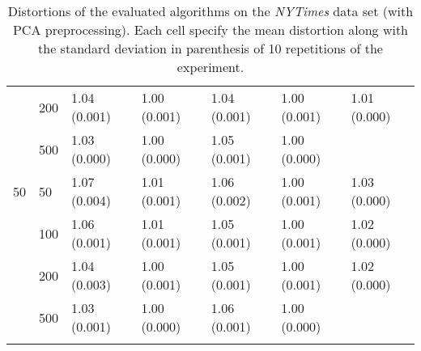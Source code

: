 \begin{longtable}{lllllll}
   & 200 &  1.04 (0.001) &   1.00 (0.001) &  1.04 (0.001) &         1.00 (0.001) &  1.01 (0.000) \\
   & 500 &  1.03 (0.000) &   1.00 (0.000) &  1.05 (0.001) &         1.00 (0.000) &  \\
 \midrule
50 & 50  &  1.07 (0.004) &   1.01 (0.001) &  1.06 (0.002) &         1.00 (0.001) &  1.03 (0.000) \\
   & 100 &  1.06 (0.001) &   1.01 (0.001) &  1.05 (0.001) &         1.00 (0.001) &  1.02 (0.000) \\
   & 200 &  1.04 (0.003) &   1.00 (0.001) &  1.05 (0.001) &         1.00 (0.001) &  1.02 (0.000) \\
   & 500 &  1.03 (0.001) &   1.00 (0.000) &  1.06 (0.001) &         1.00 (0.000) &            \\
\bottomrule
\caption{Distortions of the evaluated algorithms on the \textit{NYTimes} data set (with PCA preprocessing). Each cell specify the mean distortion along with the standard deviation in parenthesis of 10 repetitions of the experiment.}
\label{tab:distortions-mean-std-nytimes-pca}
\end{longtable}

